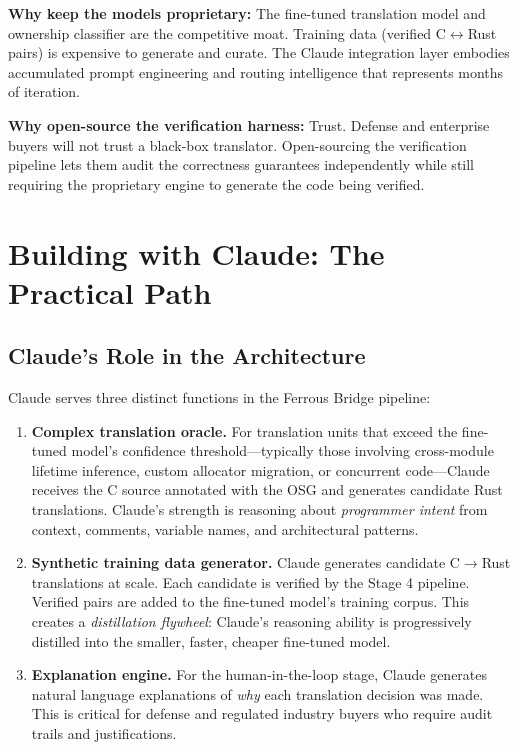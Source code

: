 \documentclass[11pt,a4paper]{article}
\theoremstyle{definition}
\theoremstyle{remark}
\begin{document}
\textbf{Why keep the models proprietary:} The fine-tuned translation model and ownership classifier are the competitive moat. Training data (verified C$\leftrightarrow$Rust pairs) is expensive to generate and curate. The Claude integration layer embodies accumulated prompt engineering and routing intelligence that represents months of iteration.

\textbf{Why open-source the verification harness:} Trust. Defense and enterprise buyers will not trust a black-box translator. Open-sourcing the verification pipeline lets them audit the correctness guarantees independently while still requiring the proprietary engine to generate the code being verified.


\section{Building with Claude: The Practical Path}

\subsection{Claude's Role in the Architecture}

Claude serves three distinct functions in the Ferrous Bridge pipeline:

\begin{enumerate}[leftmargin=2em]
\item \textbf{Complex translation oracle.} For translation units that exceed the fine-tuned model's confidence threshold---typically those involving cross-module lifetime inference, custom allocator migration, or concurrent code---Claude receives the C source annotated with the OSG and generates candidate Rust translations. Claude's strength is reasoning about \textit{programmer intent} from context, comments, variable names, and architectural patterns.

\item \textbf{Synthetic training data generator.} Claude generates candidate C$\to$Rust translations at scale. Each candidate is verified by the Stage 4 pipeline. Verified pairs are added to the fine-tuned model's training corpus. This creates a \textit{distillation flywheel}: Claude's reasoning ability is progressively distilled into the smaller, faster, cheaper fine-tuned model.

\item \textbf{Explanation engine.} For the human-in-the-loop stage, Claude generates natural language explanations of \textit{why} each translation decision was made. This is critical for defense and regulated industry buyers who require audit trails and justifications.
\end{enumerate}
\end{document}
